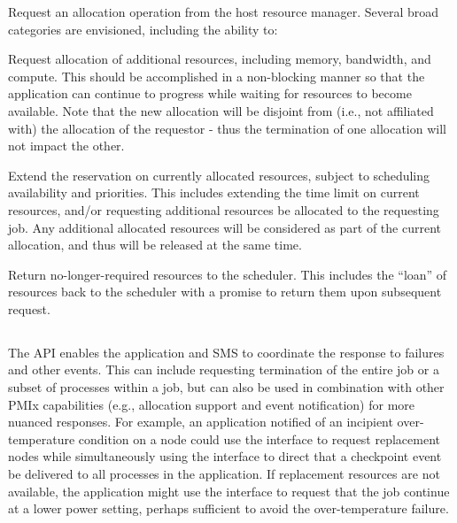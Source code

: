 \optattrend

\descr

Request an allocation operation from the host resource manager.
Several broad categories are envisioned, including the ability to:

\begin{compactitem}
%
\item Request allocation of additional resources, including memory, bandwidth, and compute.
This should be accomplished in a non-blocking manner so that the application can continue to progress while waiting for resources to become available.
Note that the new allocation will be disjoint from (i.e., not affiliated with) the allocation of the requestor - thus the termination of one allocation will not impact the other.
%
\item Extend the reservation on currently allocated resources, subject to scheduling availability and priorities.
This includes extending the time limit on current resources, and/or requesting additional resources be allocated to the requesting job.
Any additional allocated resources will be considered as part of the current allocation, and thus will be released at the same time.
%
\item Return no-longer-required resources to the scheduler.
This includes the ``loan'' of resources back to the scheduler with a promise to return them upon subsequent request.
\end{compactitem}

\subsection{}

The  \ac{API} enables the application and \ac{SMS} to coordinate the response to failures and other events.
This can include requesting termination of the entire job or a subset of processes within a job, but can
also be used in combination with other \ac{PMIx} capabilities (e.g., allocation support and event notification) for more nuanced responses. For example, an application notified of an incipient over-temperature condition on a node could use the  interface to request replacement nodes while simultaneously using the  interface to direct that a checkpoint event be delivered to all processes in the application. If replacement resources are not available, the application might use the  interface to request that the job continue at a lower power setting, perhaps sufficient to avoid the over-temperature failure.

